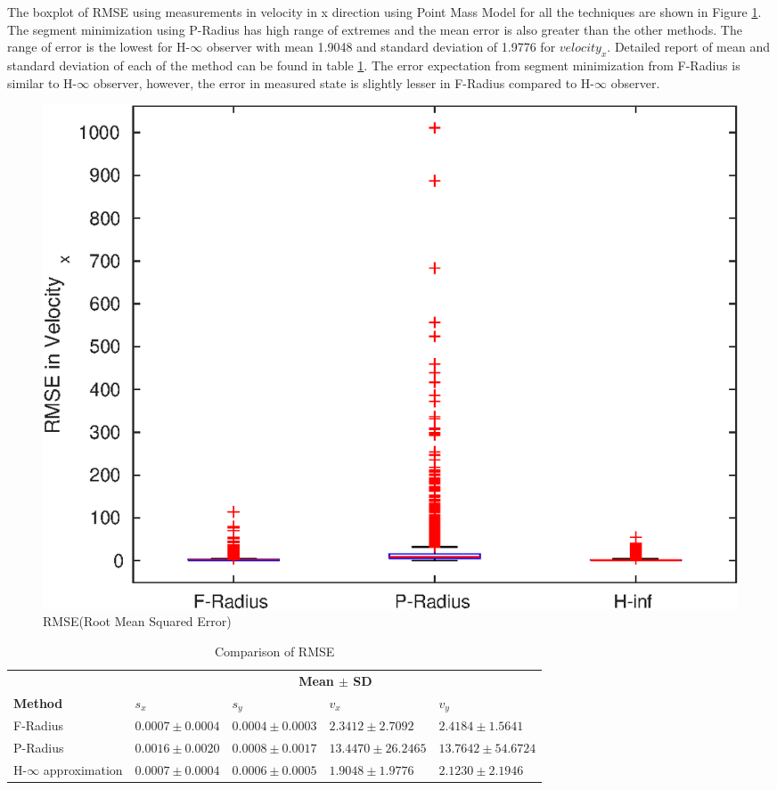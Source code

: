 The boxplot of RMSE using measurements in velocity in x direction using Point Mass Model for all the techniques are shown in Figure \ref{fig:boxplot}. The segment minimization using P-Radius has high range of extremes and the mean error is also greater than the other methods. The range of error is the lowest for H-$\infty$ observer with mean 
1.9048 and standard deviation of 1.9776 for $velocity_x$. Detailed report of mean and standard deviation of each of the method can be found in table \ref{tab:errormean}. The error expectation from segment minimization from F-Radius is similar to H-$\infty$ observer, however, the error in measured state is slightly lesser in F-Radius compared to H-$\infty$ observer.
\begin{figure}[h]
\centering
\includegraphics[width=\linewidth]{figures/Error/boxplotall}
\caption{RMSE(Root Mean Squared Error)}
\label{fig:boxplot}
\end{figure}

\begin{table}[htbp]
\caption{Comparison of RMSE}
	\centering
	\renewcommand{\arraystretch}{1.1}
	\small	
	\begin{tabular}{l l l l l}
		\toprule 
		& \multicolumn{4}{c}{\textbf{Mean $\pm$ SD}} \\ \cmidrule{2-5}
		\textbf{Method} & \textbf{$s_x$} & \textbf{$s_y$} & \textbf{$v_x$} & \textbf{$v_y$}\\ \midrule
		F-Radius & $0.0007\pm 0.0004$ &  $0.0004  \pm 0.0003$ &  $2.3412 \pm 2.7092$ &   $2.4184 \pm 1.5641$ \\
		P-Radius & $0.0016 \pm 0.0020$ &   $0.0008 \pm 0.0017$  & $13.4470 \pm 26.2465$ &  $13.7642 \pm 54.6724$\\
		H-$\infty$ approximation & $0.0007 \pm 0.0004$ &  $0.0006 \pm 0.0005$   & $1.9048 \pm  1.9776$  &  $ 2.1230 \pm  2.1946$\\
		\bottomrule
	\end{tabular}
	\label{tab:errormean}
\end{table}

